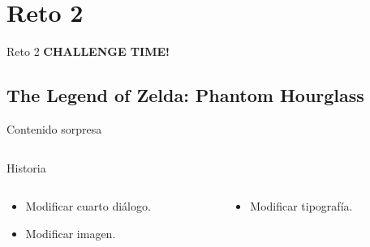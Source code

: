 \section{Reto 2}
\begin{frame}{Reto 2}
    \Huge\centering\textbf{CHALLENGE TIME!}
\end{frame}

\subsection{The Legend of Zelda: Phantom Hourglass}
\begin{frame}[t]{Contenido sorpresa}
    \begin{columns}
    \begin{column}[T]{0.5\textwidth}
        \centering
    \end{column}
    \hfill
    \begin{column}[T]{0.5\textwidth}
        \centering
    \end{column}
    \end{columns}
\end{frame}

\begin{frame}{Historia}
    \begin{columns}
    \begin{column}{0.5\textwidth}
        \begin{itemize}
            \item<1-> Modificar cuarto diálogo.
            \item<2-> Modificar imagen.
        \end{itemize}
        \vfill{}
        \hfill{}
    \end{column}
    \begin{column}{0.5\textwidth}
        \hfill{}
        \vfill{}
        \begin{itemize}
            \item<3-> Modificar tipografía.
        \end{itemize}
    \end{column}
    \end{columns}
\end{frame}

